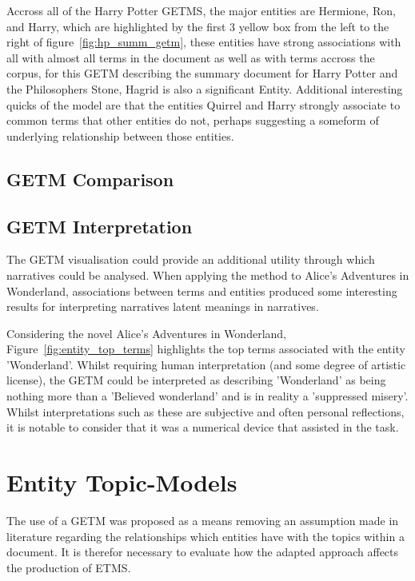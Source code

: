 \documentclass[10pt]{report}
\begin{document}
Accross all of the Harry Potter GETMS, the major entities are Hermione, Ron, and Harry, which are highlighted by the first 3 yellow box from the left to the right of figure~\ref{fig:hp_summ_getm}, these entities have strong associations with all with almost all terms in the document as well as with terms accross the corpus, for this GETM describing the summary document for Harry Potter and the Philosophers Stone, Hagrid is also a significant Entity. Additional interesting quicks of the model are that the entities  Quirrel and Harry strongly associate to common terms that other entities do not, perhaps suggesting a someform of underlying relationship between those entities.


\clearpage
\subsection{GETM Comparison}



\subsection{GETM Interpretation}
The GETM visualisation could provide an additional utility through which narratives could be analysed. When applying the method to Alice's Adventures in Wonderland, associations between terms and entities produced some interesting results for interpreting narratives latent meanings in narratives.

Considering the novel Alice's Adventures in Wonderland, Figure~\ref{fig:entity_top_terms} highlights the top terms associated with the entity 'Wonderland'. Whilst requiring human interpretation (and some degree of artistic license), the GETM could be interpreted as describing 'Wonderland' as being nothing more than a 'Believed wonderland' and is in reality a 'suppressed misery'. Whilst interpretations such as these are subjective and often personal reflections, it is notable to consider that it was a numerical device that assisted in the task.

\clearpage
\section{Entity Topic-Models}
The use of a GETM was proposed as a means removing an assumption made in literature regarding the relationships which entities have with the topics within a document. It is therefor necessary to evaluate how the adapted approach affects the production of ETMS.
\end{document}
